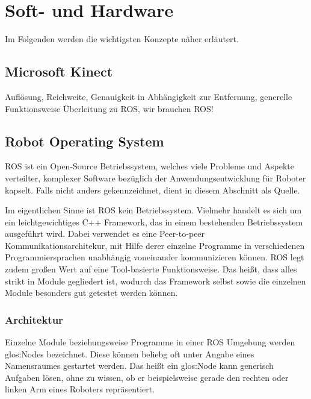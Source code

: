 \section{Soft- und Hardware}
\label{sec:softundhardware}

Im Folgenden werden die wichtigsten Konzepte näher erläutert.

\subsection{Microsoft Kinect}
{\color{red}Auflösung, Reichweite, Genauigkeit in Abhängigkeit zur Entfernung, generelle Funktionsweise} {\color{red}Überleitung zu ROS, wir brauchen ROS!}

\subsection{Robot Operating System}

\gls{ROS} ist ein Open-Source Betriebssystem, welches viele Probleme und Aspekte verteilter, komplexer Software bezüglich der Anwendungsentwicklung für Roboter kapselt. Falls nicht anders gekennzeichnet, dient \cite{Quigley:2009kx} in diesem Abschnitt als Quelle.

Im eigentlichen Sinne ist \gls{ROS} kein Betriebssystem. Vielmehr handelt es sich um ein leichtgewichtiges C++ Framework, das in einem bestehenden Betriebssystem ausgeführt wird. Dabei verwendet es eine Peer-to-peer Kommunikationsarchitekur, mit Hilfe derer einzelne Programme in verschiedenen Programmiersprachen unabhängig voneinander kommunizieren können. \gls{ROS} legt zudem großen Wert auf eine Tool-basierte Funktionsweise. Das heißt, dass alles strikt in Module gegliedert ist, wodurch das Framework selbst sowie die einzelnen Module besonders gut getestet werden können.

\subsubsection{Architektur}

Einzelne Module beziehungsweise Programme in einer \gls{ROS} Umgebung werden \glspl{glos:Node} bezeichnet. Diese können beliebg oft unter Angabe eines Namensraumes gestartet werden. Das heißt ein \gls{glos:Node} kann generisch Aufgaben lösen, ohne zu wissen, ob er beispielsweise gerade den rechten oder linken Arm eines Roboters repräsentiert.

